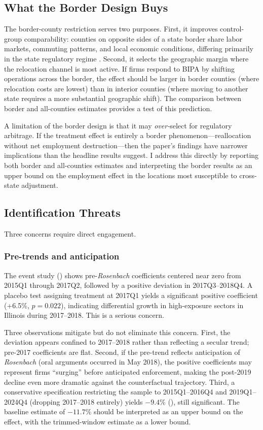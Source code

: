 \documentclass[12pt]{article}
\begin{document}
\subsection{What the Border Design Buys}

The border-county restriction serves two purposes. First, it improves control-group comparability: counties on opposite sides of a state border share labor markets, commuting patterns, and local economic conditions, differing primarily in the state regulatory regime \citep{dube2010, holmes1998}. Second, it selects the geographic margin where the relocation channel is most active. If firms respond to BIPA by shifting operations across the border, the effect should be larger in border counties (where relocation costs are lowest) than in interior counties (where moving to another state requires a more substantial geographic shift). The comparison between border and all-counties estimates provides a test of this prediction.

A limitation of the border design is that it may \textit{over-}select for regulatory arbitrage. If the treatment effect is entirely a border phenomenon---reallocation without net employment destruction---then the paper's findings have narrower implications than the headline results suggest. I address this directly by reporting both border and all-counties estimates and interpreting the border results as an upper bound on the employment effect in the locations most susceptible to cross-state adjustment.

\subsection{Identification Threats}
\label{subsec:threats}

Three concerns require direct engagement.

\subsubsection*{Pre-trends and anticipation} The event study () shows pre-\textit{Rosenbach} coefficients centered near zero from 2015Q1 through 2017Q2, followed by a positive deviation in 2017Q3--2018Q4. A placebo test assigning treatment at 2017Q1 yields a significant positive coefficient (+6.5\%, $p = 0.022$), indicating differential growth in high-exposure sectors in Illinois during 2017--2018. This is a serious concern.

Three observations mitigate but do not eliminate this concern. First, the deviation appears confined to 2017--2018 rather than reflecting a secular trend; pre-2017 coefficients are flat. Second, if the pre-trend reflects anticipation of \textit{Rosenbach} (oral arguments occurred in May 2018), the positive coefficients may represent firms ``surging'' before anticipated enforcement, making the post-2019 decline even more dramatic against the counterfactual trajectory. Third, a conservative specification restricting the sample to 2015Q1--2016Q4 and 2019Q1--2024Q4 (dropping 2017--2018 entirely) yields $-9.4\%$ (), still significant. The baseline estimate of $-11.7\%$ should be interpreted as an upper bound on the effect, with the trimmed-window estimate as a lower bound.
\end{document}
